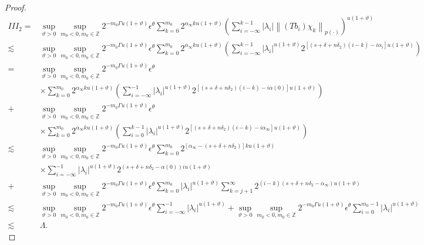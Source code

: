\documentclass[oneside,reqno]{amsart}
\numberwithin{equation}{section}
\theoremstyle{definition}
\begin{document}
\begin{proof}
\begin{align*}
I I I_{2}= & \sup_{\vartheta>0 }\sup _{m_0<0, m_0\in  \mathbb{Z}} 2^{-m_0\Gamma u(1+\vartheta)} \epsilon  ^\theta \sum_{k=0}^{m_0} 2^{\alpha_{\infty} k u(1+\vartheta)}\left(\sum_{i=-\infty}^{k-1}\left|\lambda_{i}\right|\left\|\left(T b_{i}\right) \chi_{k}\right\|_{{p(\cdot)}}\right)^{u(1+\vartheta)} \\
\lesssim & \sup_{\vartheta>0 }\sup _{m_0<0, m_0\in  \mathbb{Z}} 2^{-m_0\Gamma u(1+\vartheta)} \epsilon  ^\theta  \sum_{k=0}^{m_0} 2^{\alpha_{\infty} k u(1+\vartheta)}\left(\sum_{i=-\infty}^{k-1}\left|\lambda_{i}\right|^{u(1+\vartheta)} 2^{\left[\left(s+\delta+n \delta_{2}\right)(i-k)-i \alpha_{i}\right] u(1+\vartheta)}\right) \\
= & \sup_{\vartheta>0 }\sup _{m_0<0, m_0\in  \mathbb{Z}} 2^{-m_0\Gamma u(1+\vartheta)} \epsilon  ^\theta\\
& \times \sum_{k=0}^{m_0} 2^{\alpha_{\infty} k u(1+\vartheta)}\left(\sum_{i=-\infty}^{-1}\left|\lambda_{i}\right|^{u(1+\vartheta)} 2^{\left[\left(s+\delta+n \delta_{2}\right)(i-k)-i \alpha(0)\right] u(1+\vartheta)}\right) \\
+& \sup_{\vartheta>0 }\sup _{m_0<0, m_0\in  \mathbb{Z}} 2^{-m_0\Gamma u(1+\vartheta)} \epsilon  ^\theta \\
& \times \sum_{k=0}^{m_0} 2^{\alpha_{\infty} k u(1+\vartheta)}\left(\sum_{i=0}^{k-1}\left|\lambda_{i}\right|^{u(1+\vartheta)} 2^{\left[\left(s+\delta+n \delta_{2}\right)(i-k)-i \alpha_{\infty}\right] u(1+\vartheta)}\right)\\
\lesssim & \sup_{\vartheta>0 }\sup _{m_0<0, m_0\in  \mathbb{Z}} 2^{-m_0\Gamma u(1+\vartheta)} \epsilon  ^\theta \sum_{k=0}^{m_0} 2^{\left[\alpha_{\infty}-\left(s+\delta+n \delta_{2}\right)\right] k u(1+\vartheta)} \\
& \times \sum_{i=-\infty}^{-1}\left|\lambda_{i}\right|^{u(1+\vartheta)} 2^{\left(s+\delta+n \delta_{2}-\alpha(0)\right) iu (1+\vartheta)} \\
+& \sup_{\vartheta>0 }\sup _{m_0<0, m_0\in  \mathbb{Z}} 2^{-m_0\Gamma u(1+\vartheta)} \epsilon  ^\theta \sum_{k=0}^{m_0}\left|\lambda_{i}\right|^{u(1+\vartheta)} \sum_{k=j+1}^{\infty} 2^{(i-k)\left(s+\delta+n \delta_{2}-\alpha_{\infty}\right) u(1+\vartheta)} \\
\lesssim & \sup_{\vartheta>0 }\sup _{m_0<0, m_0\in  \mathbb{Z}} 2^{-m_0\Gamma u(1+\vartheta)} \epsilon  ^\theta \sum_{i=-\infty}^{-1}\left|\lambda_{i}\right|^{u(1+\vartheta)}+\sup_{\vartheta>0 }\sup _{m_0<0, m_0\in  \mathbb{Z}} 2^{-m_0\Gamma u(1+\vartheta)} \epsilon  ^\theta \sum_{i=0}^{m_0-1}\left|\lambda_{i}\right|^{u(1+\vartheta)} \\
\lesssim & \Lambda .
\end{align*}






\end{proof}
\end{document}
